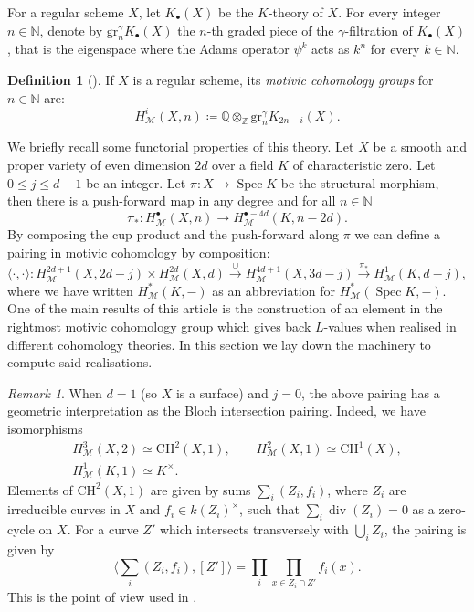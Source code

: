 \documentclass[11pt, a4paper, reqno]{amsart}
\theoremstyle{definition}
\newtheorem{definition}{Definition}[subsection]
\theoremstyle{plain}
\theoremstyle{remark}
\newtheorem*{remark}{Remark}
\DeclareMathOperator{\Spec}{Spec}
\DeclareMathOperator{\mot}{\mathscr{M}}
\newcommand{\numberset}{\mathbb}
\newcommand{\Q}{\numberset{Q}}
\newcommand{\Z}{\numberset{Z}}
\newcommand{\N}{\numberset{N}}
\newcommand{\CH}{\mathrm{CH}}
\renewcommand{\le}{\leqslant}
\renewcommand{\leq}{\le}
\begin{document}
  For a regular scheme $X$, let $K_{\bullet}(X)$ be the $K$-theory of $X$. For every integer $n\in\N$, denote by $\mathrm{gr}^{\gamma}_n K_{\bullet}(X)$ the $n$-th graded piece of the $\gamma$-filtration of $K_{\bullet}(X)$, that is the eigenspace where the Adams operator $\psi^k$ acts as $k^n$ for every $k\in\N$.

  \begin{definition}[\cite{beilinson84}]
   If $X$ is a regular scheme, its \emph{motivic cohomology groups} for $n\in\N$ are:
   \[
    H^i_{\mot}(X,n) \coloneqq \Q \otimes_{\Z} \mathrm{gr}_n^{\gamma} K_{2n-i}(X).
   \]
  \end{definition}

  We briefly recall some functorial properties of this theory. Let $X$ be a smooth and proper variety of even dimension $2d$ over a field $K$ of characteristic zero. Let $0\leq j\leq d-1$ be an integer. Let $\pi \colon X \to \Spec K$ be the structural morphism, then there is a push-forward map in any degree and for all $n\in\N$
  \[
   \pi_* \colon H_{\mot}^{\bullet}(X,n) \to H_{\mot}^{\bullet-4d}(K, n-2d).
  \]
  By composing the cup product and the push-forward along $\pi$ we can define a pairing in motivic cohomology by composition:
  \[
   \langle\cdot ,\cdot \rangle \colon H^{2d+1}_{\mot}(X,2d-j) \times H^{2d}_{\mot}(X,d) \xrightarrow{\cup} H^{4d+1}_{\mot}(X,3d-j) \xrightarrow{\pi_*} H^1_{\mot}(K, d-j),
  \]
  where we have written $H^*_{\mot}(K, -)$ as an abbreviation for $H^*_{\mot}(\Spec K, -)$. One of the main results of this article is the construction of an element in the rightmost motivic cohomology group which gives back $L$-values when realised in different cohomology theories. In this section we lay down the machinery to compute said realisations.

  \begin{remark}
   When $d = 1$ (so $X$ is a surface) and $j = 0$, the above pairing has a geometric interpretation as the Bloch intersection pairing. Indeed, we have isomorphisms
   \begin{gather*}
    H_{\mot}^{3}(X, 2) \simeq \CH^{2}(X, 1), \qquad
    H_{\mot}^{2}(X, 1) \simeq \CH^1(X), \\
    H_{\mot}^1(K,1) \simeq K^{\times}.
   \end{gather*}
   Elements of $\CH^{2}(X, 1)$ are given by sums $\sum_i (Z_i, f_i)$, where $Z_i$ are irreducible curves in $X$ and $f_i \in k(Z_i)^\times$, such that $\sum_i \operatorname{div}(Z_i) = 0$ as a zero-cycle on $X$. For a curve $Z'$ which intersects transversely with $\bigcup_i Z_i$, the pairing is given by
   \[
       \langle \sum_i (Z_i, f_i), [Z'] \rangle = \prod_i \prod_{x \in Z_i \cap Z'} f_i(x).
   \]
   This is the point of view used in \cite{Dasgupta-factorization}.
  \end{remark}
  
\end{document}
